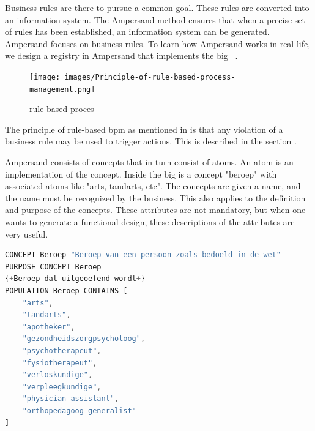 Business rules are there to pursue a common goal.
These rules are converted into an information system. 
The Ampersand method ensures that when a precise set of rules has been established, an information system can be generated. 
Ampersand focuses on business rules.
To learn how Ampersand works in real life, we design a registry in Ampersand that implements the \acrshort{big}~ .

\begin{figure} 
\texttt{[image: images/Principle-of-rule-based-process-management.png]}
\caption{rule-based-proces}
\label{fig:rule-based-proces}
\end{figure}


The principle of rule-based \acrfull{bpm} as mentioned in  is that any violation of a business rule may be used to trigger actions. 
This is described in the section .

Ampersand consists of concepts that in turn consist of atoms.
An atom is an implementation of the concept.
Inside the \acrshort{big} is a concept "beroep" with associated atoms like "arts, tandarts, etc".
The concepts are given a name, and the name must be recognized by the business.
This also applies to the definition and purpose of the concepts.
These attributes are not mandatory, but when one wants to generate a functional design, these descriptions of the attributes are very useful.
\begin{lstlisting}[language=Octave] 
CONCEPT Beroep "Beroep van een persoon zoals bedoeld in de wet" 
PURPOSE CONCEPT Beroep 
{+Beroep dat uitgeoefend wordt+}
POPULATION Beroep CONTAINS [
    "arts",
    "tandarts",
    "apotheker",
    "gezondheidszorgpsycholoog",
    "psychotherapeut",
    "fysiotherapeut",
    "verloskundige",
    "verpleegkundige",
    "physician assistant",
    "orthopedagoog-generalist"
]
\end{lstlisting}

